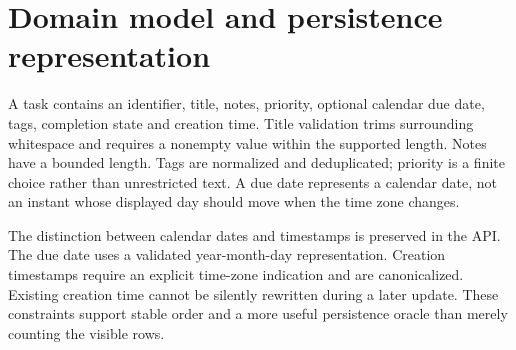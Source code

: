 \documentclass[12pt,a4paper,oneside]{report}
\begin{document}
\section{Domain model and persistence representation}
A task contains an identifier, title, notes, priority, optional calendar due date, tags, completion state and creation time. Title validation trims surrounding whitespace and requires a nonempty value within the supported length. Notes have a bounded length. Tags are normalized and deduplicated; priority is a finite choice rather than unrestricted text. A due date represents a calendar date, not an instant whose displayed day should move when the time zone changes.

The distinction between calendar dates and timestamps is preserved in the API. The due date uses a validated year-month-day representation. Creation timestamps require an explicit time-zone indication and are canonicalized. Existing creation time cannot be silently rewritten during a later update. These constraints support stable order and a more useful persistence oracle than merely counting the visible rows.
\end{document}
